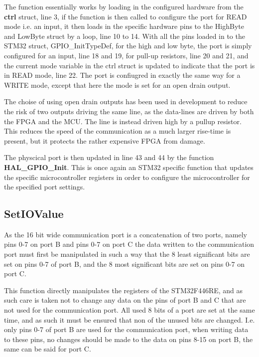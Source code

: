 The function essentially works by loading in the configured hardware from the \textbf{ctrl} struct, line 3, if the function is then called to configure the port for READ mode i.e. an input, it then loads in the specific hardware pins to the HighByte and LowByte struct by a loop, line 10 to 14. With all the pins loaded in to the STM32 struct, GPIO\_InitTypeDef, for the high and low byte, the port is simply configured for an input, line 18 and 19, for pull-up resistors, line 20 and 21, and the current mode variable in the ctrl struct is updated to indicate that the port is in READ mode, line 22. The port is confiugred in exactly the same way for a WRITE mode, except that here the mode is set for an open drain output.

The choise of using open drain outputs has been used in development to reduce the risk of two outputs driving the same line, as the data-lines are driven by both the FPGA and the MCU. The line is instead driven high by a pullup resistor. This reduces the speed of the communication as a much larger rise-time is present, but it protects the rather expensive FPGA from damage.

The physcical port is then updated in line 43 and 44 by the function \textbf{HAL\_GPIO\_Init}. This is once again an STM32 specific function that updates the specific microcontroller registers in order to configure the microcontroller for the specified port settings.

\subsection*{SetIOValue}
As the 16 bit wide communication port is a concatenation of two ports, namely pins 0-7 on port B and pins 0-7 on port C the data written to the communication port must first be manipulated in such a way that the 8 least significant bits are set on pins 0-7 of port B, and the 8 most significant bits are set on pins 0-7 on port C.

This function directly manipulates the registers of the STM32F446RE, and as such care is taken not to change any data on the pins of port B and C that are not used for the communication port. All used 8 bits of a port are set at the same time, and as such it must be ensured that non of the unused bits are changed. I.e. only pins 0-7 of port B are used for the communication port, when writing data to these pins, no changes should be made to the data on pins 8-15 on port B, the same can be said for port C.

